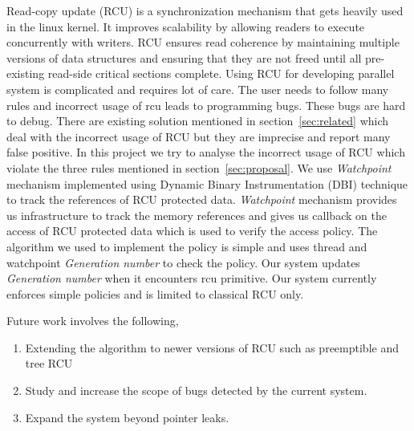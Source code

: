 Read-copy update (RCU) is a synchronization mechanism that gets heavily used in
 the linux kernel. It improves scalability by allowing readers to execute
concurrently with writers. RCU ensures read coherence by maintaining multiple
versions of data structures and ensuring that they are not freed until all
pre-existing read-side critical sections complete. Using RCU for developing
parallel system is complicated and requires lot of care. The user needs to follow
many rules and incorrect usage of rcu leads to programming bugs.
These bugs are hard to debug. There are existing solution mentioned in section~\ref{sec:related}
which deal with the incorrect usage of RCU but they are imprecise and report
many false positive.  In this project we try to analyse the incorrect
usage of RCU which violate the three rules mentioned in section~\ref{sec:proposal}.
We use \emph{Watchpoint} mechanism implemented using Dynamic Binary
Instrumentation (DBI) technique to track the references of RCU protected data.
\emph{Watchpoint} mechanism provides us infrastructure to track the memory
references and gives us callback on the access of RCU protected data which is
used to verify the access policy. The algorithm we used to implement the policy
is simple and uses thread and watchpoint \emph{Generation number} to check the
policy.  Our system updates \emph{Generation number} when it encounters rcu
primitive. Our system currently enforces simple policies and is limited to
classical RCU only.

Future work involves the following,
\begin{enumerate}
\item Extending the algorithm to newer versions of RCU such as preemptible
and tree RCU
\item Study and increase the scope of bugs detected by the current system.
\item Expand the system beyond pointer leaks.
\end{enumerate}
